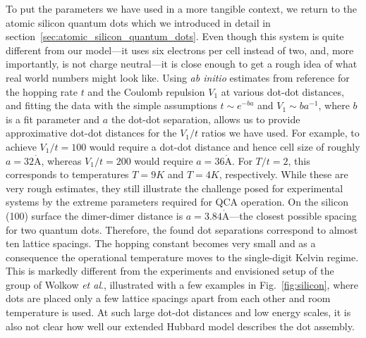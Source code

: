 To put the parameters we have used in a more tangible context, we return to the
atomic silicon quantum dots which we introduced in detail in
section~\ref{sec:atomic_silicon_quantum_dots}. Even though this system is quite
different from our model---it uses six electrons per cell instead of two, and,
more importantly, is not charge neutral---it is close enough to get a rough idea
of what real world numbers might look like. Using \emph{ab initio} estimates
from reference \cite{pitters2011tunnel} for the hopping rate $t$ and the Coulomb
repulsion $V_1$ at various dot-dot distances, and fitting the data with the
simple assumptions $t \sim e^{-b a}$ and $V_1 \sim b a^{-1}$, where $b$ is a fit
parameter and $a$ the dot-dot separation, allows us to provide approximative
dot-dot distances for the $V_1/t$ ratios we have used. For example, to achieve
$V_1/t = 100$ would require a dot-dot distance and hence cell size of roughly $a
= 32 \mathring{\mathrm{A}}$, whereas $V_1/t = 200$ would require $a = 36
\mathring{\mathrm{A}}$. For $T/t = 2$, this corresponds to temperatures $T = 9K$
and $T = 4K$, respectively. While these are very rough estimates, they still
illustrate the challenge posed for experimental systems by the extreme
parameters required for QCA operation. On the silicon (100) surface the
dimer-dimer distance is $a = 3.84 \mathring{\mathrm{A}}$---the closest possible
spacing for two quantum dots. Therefore, the found dot separations correspond
to almost ten lattice spacings. The hopping constant becomes very small and as a
consequence the operational temperature moves to the single-digit Kelvin regime.
This is markedly different from the experiments and envisioned setup of the
group of Wolkow \emph{et al}., illustrated with a few examples in
Fig.~\ref{fig:silicon}, where dots are placed only a few lattice spacings apart
from each other and room temperature is used. At such large dot-dot distances
and low energy scales, it is also not clear how well our extended Hubbard model
describes the dot assembly.



